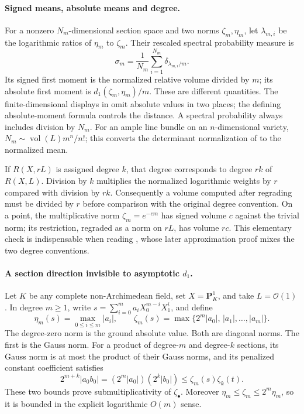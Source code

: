 \paragraph{Signed means, absolute means and degree.}
For a nonzero \(N_m\)-dimensional section space and two norms
\(\zeta_m,\eta_m\), let \(\lambda_{m,i}\) be the logarithmic
ratios of \(\eta_m\) to \(\zeta_m\). Their rescaled spectral
probability measure is
\[
 \sigma_m=\frac1{N_m}\sum_{i=1}^{N_m}
                  \delta_{\lambda_{m,i}/m}.
\]
Its signed first moment is the normalized relative volume divided
by \(m\); its absolute first moment is \(d_1(\zeta_m,\eta_m)/m\).
These are different quantities. The finite-dimensional displays
in \cite[Definition~1.4.4]{Reb20AsymptoticFSV1} omit absolute values
in two places; the defining absolute-moment formula controls the
distance. A spectral probability always includes division by
\(N_m\). For an ample line bundle on an \(n\)-dimensional variety,
\(N_m\sim\operatorname{vol}(L)m^n/n!\); this converts the
determinant normalization of \cite{BE21} to the normalized mean.

If \(R(X,rL)\) is assigned degree \(k\), that degree corresponds
to degree \(rk\) of \(R(X,L)\). Division by \(k\) multiplies
the normalized logarithmic weights by \(r\) compared with
division by \(rk\). Consequently a volume computed after
regrading must be divided by \(r\) before comparison with the
original degree convention. On a point, the multiplicative norm
\(\zeta_m=e^{-cm}\) has signed volume \(c\) against the trivial
norm; its restriction, regraded as a norm on \(rL\), has volume
\(rc\). This elementary check is indispensable when reading
\cite[Proposition~3.3.5 and Theorem~4.5.4]{Reb20AsymptoticFSV1},
whose later approximation proof mixes the two degree conventions.

\paragraph{A section direction invisible to asymptotic \(d_1\).}
Let \(K\) be any complete non-Archimedean field, set
\(X=\mathbf P^1_K\), and take \(L=\mathcal O(1)\).
In degree \(m\ge1\), write
\(s=\sum_{i=0}^m a_iX_0^{m-i}X_1^i\), and define
\[
 \eta_m(s)=\max_{0\le i\le m}|a_i|,
 \qquad
 \zeta_m(s)=\max\{2^m|a_0|,\,|a_1|,\ldots,|a_m|\}.
\]
The degree-zero norm is the ground absolute value.
Both are diagonal norms. The first is the Gauss norm.
For a product of degree-\(m\) and degree-\(k\) sections, its
Gauss norm is at most the product of their Gauss norms, and its
penalized constant coefficient satisfies
\[
 2^{m+k}|a_0b_0|=(2^m|a_0|)(2^k|b_0|)
                  \le\zeta_m(s)\zeta_k(t).
\]
These two bounds prove submultiplicativity of \(\zeta_\bullet\).
Moreover \(\eta_m\le\zeta_m\le2^m\eta_m\), so it is bounded
in the explicit logarithmic \(O(m)\) sense.

